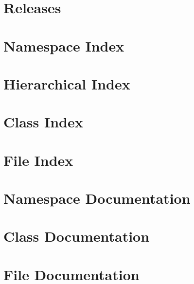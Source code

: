 \let\mypdfximage\pdfximage\def\pdfximage{\immediate\mypdfximage}\documentclass[twoside]{book}
\newcommand{\+}{\discretionary{\mbox{\scriptsize$\hookleftarrow$}}{}{}}
\newcommand{\clearemptydoublepage}{%
  \newpage{\pagestyle{empty}\cleardoublepage}%
}
\begin{document}
\chapter{Releases}
\label{md_docs_09_releases}

\chapter{Namespace Index}

\chapter{Hierarchical Index}

\chapter{Class Index}

\chapter{File Index}

\chapter{Namespace Documentation}


\chapter{Class Documentation}





















\chapter{File Documentation}



































\backmatter
\newpage
{}
\clearemptydoublepage
{}
\printindex
\end{document}
